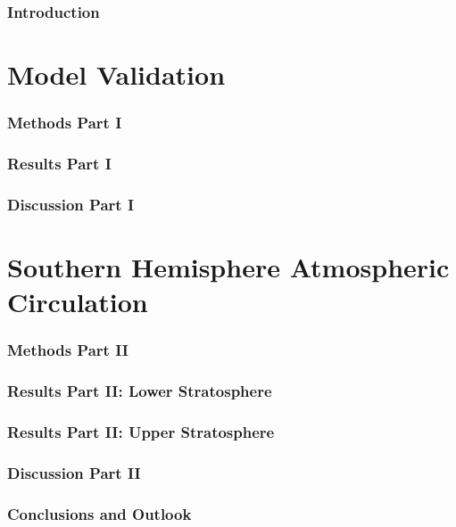 \documentclass[12pt]{article}
\newcommand\backmatter{%
    \cleardoublepage %
    \pagenumbering{Roman}} %
\begin{document}


\tableofcontents
\newpage

\section{Introduction}

\newpage

\part{Model Validation}

\section{Methods Part I}

\newpage

\section{Results Part I}

\newpage

\section{Discussion Part I}

\newpage

\part{Southern Hemisphere Atmospheric Circulation}
\section{Methods Part II}

\newpage

\section{Results Part II: Lower Stratosphere}\label{lowerstrat}

\newpage

\section{Results Part II: Upper Stratosphere}\label{upperstrat}

\newpage 

\section{Discussion Part II}

\newpage

\section{Conclusions and Outlook}

\newpage

\printbibliography

% 
\end{document}
